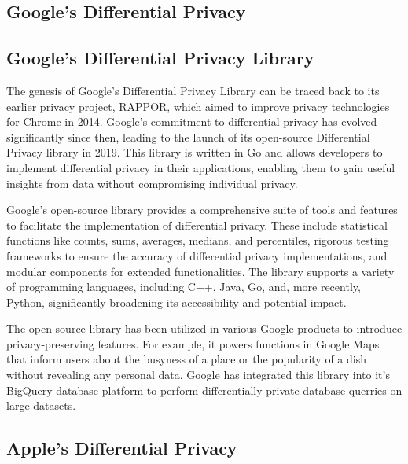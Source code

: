 \subsection{Google's Differential Privacy}
\subsection{Google's Differential Privacy Library}

The genesis of Google's Differential Privacy Library can be traced back to its earlier privacy project, RAPPOR, which aimed to improve privacy technologies for Chrome in 2014. Google's commitment to differential privacy has evolved significantly since then, leading to the launch of its open-source Differential Privacy library in 2019. This library is written in Go and allows developers to implement differential privacy in their applications, enabling them to gain useful insights from data without compromising individual privacy.\cite{Guevara_2022,RAPPOR}

Google's open-source library provides a comprehensive suite of tools and features to facilitate the implementation of differential privacy. These include statistical functions like counts, sums, averages, medians, and percentiles, rigorous testing frameworks to ensure the accuracy of differential privacy implementations, and modular components for extended functionalities. The library supports a variety of programming languages, including C++, Java, Go, and, more recently, Python, significantly broadening its accessibility and potential impact.\cite{RAPPOR}

The open-source library has been utilized in various Google products to introduce privacy-preserving features. For example, it powers functions in Google Maps that inform users about the busyness of a place or the popularity of a dish without revealing any personal data. Google has integrated this library into it's BigQuery database platform to perform differentially private database querries on large datasets.\cite{Google_BigQuery}

\subsection{Apple's Differential Privacy}

